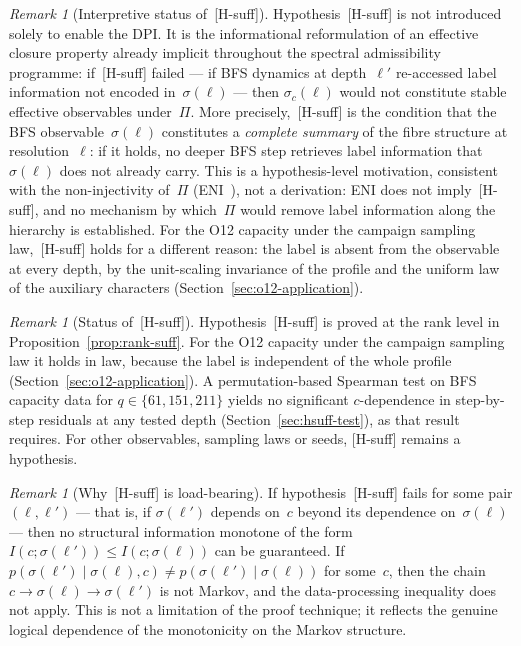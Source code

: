 \documentclass[11pt,a4paper]{article}
\theoremstyle{plain}
\theoremstyle{definition}
\theoremstyle{remark}
\newtheorem{remark}[theorem]{Remark}
\begin{document}
  \begin{remark}[Interpretive status of~\textup{[H-suff]}]
    \label{rem:suff-not-adhoc}
    Hypothesis~\textup{[H-suff]} is not introduced solely to enable the DPI.
    It is the informational reformulation of an effective closure property already
    implicit throughout the spectral admissibility programme:
    if~\textup{[H-suff]} failed --- if BFS dynamics at depth~$\ell'$ re-accessed
    label information not encoded in~$\sigma(\ell)$ ---
    then $\sigma_c(\ell)$ would not constitute stable effective observables under~$\Pi$.
    More precisely,~\textup{[H-suff]} is the condition that the BFS observable~$\sigma(\ell)$
    constitutes a \emph{complete summary} of the fibre structure at resolution~$\ell$:
    if it holds, no deeper BFS step retrieves label information that $\sigma(\ell)$ does not
    already carry.
    This is a hypothesis-level motivation, consistent with the non-injectivity of~$\Pi$
    (ENI~\cite{Beau2026l}), not a derivation: ENI does not imply~\textup{[H-suff]}, and no
    mechanism by which~$\Pi$ would remove label information along the hierarchy is established.
    For the O12 capacity under the campaign sampling law,~\textup{[H-suff]} holds for a different
    reason: the label is absent from the observable at every depth, by the unit-scaling invariance
    of the profile and the uniform law of the auxiliary characters
    (Section~\ref{sec:o12-application}).
  \end{remark}

  \begin{remark}[Status of~\textup{[H-suff]}]
    \label{rem:suff-status}
    Hypothesis~\textup{[H-suff]} is proved at the rank level in
    Proposition~\ref{prop:rank-suff}.
    For the O12 capacity under the campaign sampling law it holds in law, because the label
    is independent of the whole profile (Section~\ref{sec:o12-application}).
    A permutation-based Spearman test on BFS capacity data for $q \in \{61, 151, 211\}$
    yields no significant $c$-dependence in step-by-step residuals at any tested depth
    (Section~\ref{sec:hsuff-test}), as that result requires.
    For other observables, sampling laws or seeds, \textup{[H-suff]} remains a hypothesis.
  \end{remark}

  \begin{remark}[Why~\textup{[H-suff]} is load-bearing]
    \label{rem:loadsuff}
    If hypothesis~\textup{[H-suff]} fails for some pair $(\ell,\ell')$ ---
    that is, if $\sigma(\ell')$ depends on~$c$ beyond its dependence on~$\sigma(\ell)$
    --- then no structural information monotone of the form
    $I(c;\sigma(\ell')) \leq I(c;\sigma(\ell))$ can be guaranteed.
    If $p(\sigma(\ell') \mid \sigma(\ell), c) \neq p(\sigma(\ell') \mid \sigma(\ell))$
    for some~$c$, then the chain $c \to \sigma(\ell) \to \sigma(\ell')$ is not Markov,
    and the data-processing inequality does not apply.
    This is not a limitation of the proof technique;
    it reflects the genuine logical dependence of the monotonicity on the Markov structure.
  \end{remark}
\end{document}

